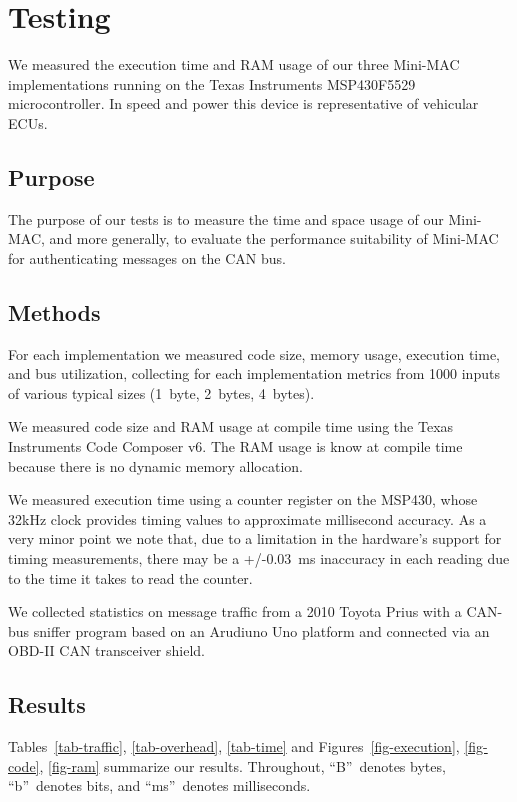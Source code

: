 \section{Testing}
\label{testing}

We measured the execution time and RAM usage of our three Mini-MAC implementations 
running on the Texas Instruments MSP430F5529 microcontroller. 
In speed and power this device is representative of vehicular ECUs.

\subsection{Purpose}
\label{purpose}

The purpose of our tests is to measure the time and space usage of our Mini-MAC, and more generally,
to evaluate the performance suitability of Mini-MAC for authenticating messages on the CAN bus.

\subsection{Methods}
\label{methods}

For each implementation we measured code size, memory usage, execution time, and bus utilization,
collecting for each implementation metrics from 1000 inputs of various typical sizes (1~byte, 2~bytes, 4~bytes).  

We measured code size and RAM usage at compile time using 
the Texas Instruments Code Composer v6.
The RAM usage is know at compile time because there is no
dynamic memory allocation.

We measured execution time using a counter register on the MSP430, 
whose 32kHz clock provides timing values to approximate millisecond accuracy. 
As a very minor point we note that, due to a limitation in the hardware's
support for timing measurements, 
there may be a +/-0.03~ms inaccuracy in each reading due to the
time it takes to read the counter.

We collected statistics on message traffic from a 2010 Toyota Prius with a CAN-bus sniffer program 
based on an Arudiuno Uno platform and connected via an OBD-II CAN transceiver shield.

\subsection{Results}
\label{results}

Tables~\ref{tab-traffic}, \ref{tab-overhead}, \ref{tab-time}
and Figures~\ref{fig-execution}, \ref{fig-code}, \ref{fig-ram}
summarize our results.
Throughout, ``B''~denotes bytes, ``b''~denotes bits, and ``ms''~denotes milliseconds.

